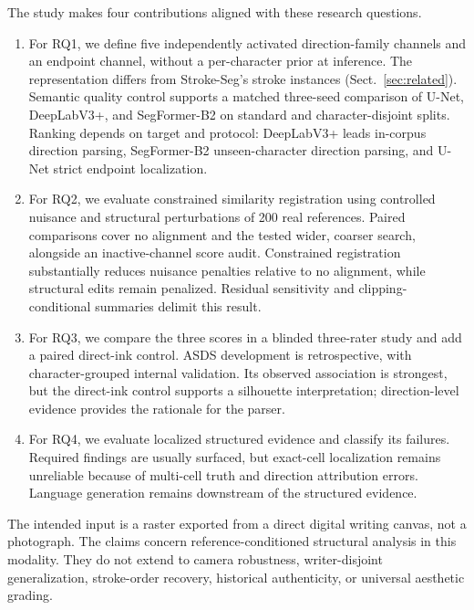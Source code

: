 The study makes four contributions aligned with these research questions.
\begin{enumerate}
  \item For RQ1, we define five independently activated direction-family
  channels and an endpoint channel, without a per-character prior at
  inference. The representation differs from Stroke-Seg's stroke instances
  (Sect.~\ref{sec:related}). Semantic quality control supports a matched
  three-seed comparison of U-Net, DeepLabV3+, and SegFormer-B2 on standard
  and character-disjoint splits. Ranking depends on
  target and protocol: DeepLabV3+ leads in-corpus direction parsing,
  SegFormer-B2 unseen-character direction parsing, and U-Net strict endpoint
  localization.
  \item For RQ2, we evaluate constrained similarity registration using
  controlled nuisance and structural perturbations of 200 real references.
  Paired comparisons cover no alignment and the tested wider, coarser search, alongside an
  inactive-channel score audit. Constrained registration
  substantially reduces nuisance penalties relative to no alignment, while
  structural edits remain penalized. Residual sensitivity and clipping-conditional
  summaries delimit this result.
  \item For RQ3, we compare the three scores in a blinded three-rater study
  and add a paired direct-ink control. ASDS development is retrospective,
  with character-grouped internal validation. Its observed association is
  strongest, but the direct-ink control supports a silhouette interpretation;
  direction-level evidence provides the rationale for the parser.
  \item For RQ4, we evaluate localized structured evidence and classify its
  failures. Required findings are usually surfaced, but exact-cell
  localization remains unreliable because of multi-cell truth and direction
  attribution errors. Language generation remains downstream of the
  structured evidence.
\end{enumerate}

The intended input is a raster exported from a direct digital writing canvas,
not a photograph. The claims concern reference-conditioned structural
analysis in this modality. They do not extend to camera robustness, writer-disjoint generalization,
stroke-order recovery, historical authenticity, or universal aesthetic
grading.
